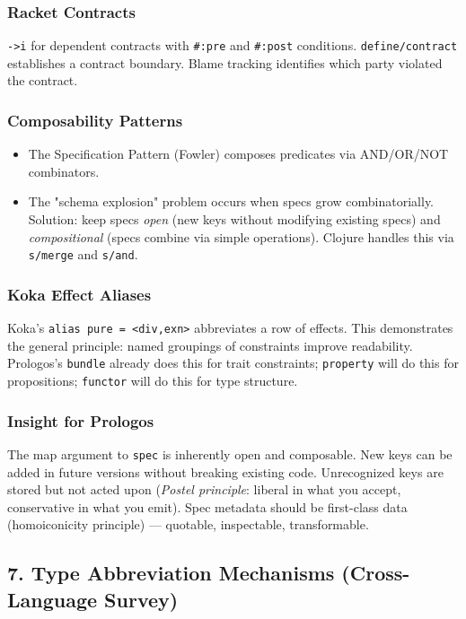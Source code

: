 \documentclass[11pt]{article}
\begin{document}
\subsubsection{Racket Contracts}
\label{sec:orga7e7e90}

\texttt{->i} for dependent contracts with \texttt{\#:pre} and \texttt{\#:post} conditions. \texttt{define/contract}
establishes a contract boundary. Blame tracking identifies which party violated
the contract.
\subsubsection{Composability Patterns}
\label{sec:org94d7b6a}

\begin{itemize}
\item The Specification Pattern (Fowler) composes predicates via AND/OR/NOT combinators.
\item The "schema explosion" problem occurs when specs grow combinatorially. Solution:
keep specs \emph{open} (new keys without modifying existing specs) and \emph{compositional}
(specs combine via simple operations). Clojure handles this via \texttt{s/merge} and \texttt{s/and}.
\end{itemize}
\subsubsection{Koka Effect Aliases}
\label{sec:org57ffbc6}

Koka's \texttt{alias pure = <div,exn>} abbreviates a row of effects. This demonstrates
the general principle: named groupings of constraints improve readability.
Prologos's \texttt{bundle} already does this for trait constraints; \texttt{property} will do
this for propositions; \texttt{functor} will do this for type structure.
\subsubsection{Insight for Prologos}
\label{sec:orgb8a7d98}

The map argument to \texttt{spec} is inherently open and composable. New keys can be added
in future versions without breaking existing code. Unrecognized keys are stored
but not acted upon (\emph{Postel principle}: liberal in what you accept, conservative
in what you emit). Spec metadata should be first-class data (homoiconicity
principle) --- quotable, inspectable, transformable.
\subsection{7. Type Abbreviation Mechanisms (Cross-Language Survey)}
\label{sec:org86b98e3}
\end{document}
